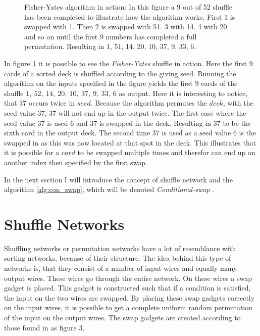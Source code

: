 \documentclass[twoside,11pt,openright]{report}
\newcommand{\FY}{\textit{Fisher-Yates} }
\newcommand{\CS}{\textit{Conditional-swap} }
\begin{document}
\begin{figure}[t]
\centering
\scalebox{1.5}{}
\caption{Fisher-Yates algorithm in action: In this figure a 9 out of 52 shuffle has been completed to illustrate how the algorithm works. First 1 is swapped with 1. Then 2 is swapped with 51. 3 with 14. 4 with 20 and so on until the first 9 numbers has completed a full permutation. Resulting in 1, 51, 14, 20, 10, 37, 9, 33, 6.}
\label{fig:fisher_yates}
\end{figure}

In figure \ref{fig:fisher_yates} it is possible to see the \FY shuffle in action. Here the first $9$ cards of a sorted deck is shuffled according to the giving seed. Running the algorithm on the inputs specified in the figure yields the first $9$ cards of the shuffle $1,~52,~14,~20,~10,~37,~9,~33,~6$ as output. Here it is interesting to notice, that $37$ occurs twice in $seed$. Because the algorithm permutes the $deck$, with the seed value $37$, $37$ will not end up in the output twice. The first case where the seed value $37$ is used $6$ and $37$ is swapped in the deck. Resulting in $37$ to be the sixth card in the output deck. The second time $37$ is used as a seed value $6$ is the swapped in as this was now located at that spot in the deck. This illustrates that it is possible for a $card$ to be swapped multiple times and therefor can end up on another index then specified by the first swap.

\bigskip

In the next section I will introduce the concept of shuffle network and the algorithm \ref{alg:con_swap}, which will be denoted \CS.


\section{Shuffle Networks}
Shuffling networks or permutation networks have a lot of resemblance with sorting networks, because of their structure. The idea behind this type of networks is, that they consist of a number of input wires and equally many output wires. These wires go through the entire network. On these wires a swap gadget is placed. This gadget is constructed such that if a condition is satisfied, the input on the two wires are swapped. By placing these swap gadgets correctly on the input wires, it is possible to get a complete uniform random permutation of the input on the output wires. The swap gadgets are created according to those found in \cite{psi} as figure 3.
\end{document}
